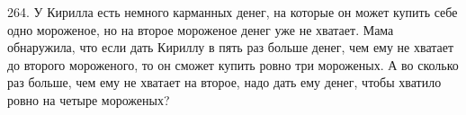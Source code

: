 264. У Кирилла есть немного карманных денег, на которые он может купить себе одно мороженое, но на второе мороженое денег уже не хватает. Мама обнаружила, что если дать Кириллу в пять раз больше денег, чем ему не хватает до второго мороженого, то он сможет купить ровно три мороженых. А во сколько раз больше, чем ему не хватает на второе, надо дать ему денег, чтобы хватило ровно на четыре мороженых?\\
